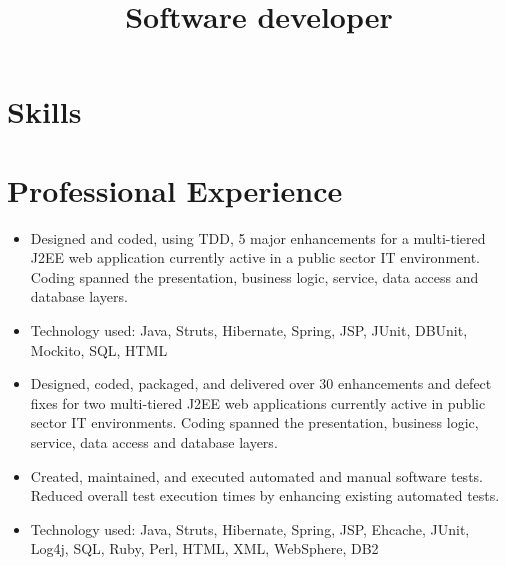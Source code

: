 \documentclass[11pt,letterpaper,sans]{moderncv}   %
\title{Software developer}               %
\begin{document}
\maketitle


\section{Skills}


\section{Professional Experience}
{\begin{itemize}%
\item Designed and coded, using TDD, 5 major enhancements for a multi-tiered
J2EE web application currently active in a public sector IT environment.
Coding spanned the presentation, business logic, service, data access and
database layers. 
\item Technology used: Java, Struts, Hibernate, Spring, JSP, JUnit,
DBUnit, Mockito, SQL, HTML
\end{itemize}}
\vspace{11pt}

{\begin{itemize}%
\item Designed, coded, packaged, and delivered over 30 enhancements
and defect fixes for two multi-tiered J2EE web applications currently active in
public sector IT environments.
Coding spanned the presentation, business logic, service, data access and
database layers.
\item Created, maintained, and executed automated and manual software tests.
Reduced overall test execution times by enhancing existing automated tests.
\item Technology used: Java, Struts, Hibernate, Spring, JSP, Ehcache, JUnit,
Log4j, SQL, Ruby, Perl, HTML, XML, WebSphere, DB2
\end{itemize}}
\vspace{11pt}
\end{document}
